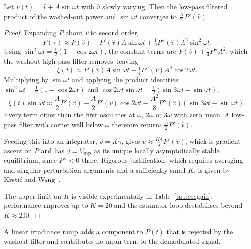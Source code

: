 \begin{proposition}
\label{prop:esc}
Let $v(t) = \hat v + A\sin\omega t$ with $\hat v$ slowly varying. Then the
low-pass filtered product of the washed-out power and $\sin\omega t$ converges
to $\tfrac{A}{2}\,P'(\hat v)$.
\end{proposition}

\begin{proof}
Expanding $P$ about $\hat v$ to second order,
\[
P(v) \approx P(\hat v) + P'(\hat v)A\sin\omega t + \tfrac{1}{2}P''(\hat v)A^2\sin^2\!\omega t .
\]
Using $\sin^2\omega t = \tfrac{1}{2}(1 - \cos 2\omega t)$, the constant terms are
$P(\hat v) + \tfrac{1}{4}P''A^2$, which the washout high-pass filter removes,
leaving
\[
\xi(t) \approx P'(\hat v)A\sin\omega t - \tfrac{1}{4}P''(\hat v)A^2\cos 2\omega t .
\]
Multiplying by $\sin\omega t$ and applying the product identities
$\sin^2\omega t = \tfrac{1}{2}(1-\cos2\omega t)$ and
$\cos 2\omega t \sin\omega t = \tfrac{1}{2}(\sin 3\omega t - \sin\omega t)$,
\[
\xi(t)\sin\omega t \approx \frac{A}{2}P'(\hat v)
- \frac{A}{2}P'(\hat v)\cos 2\omega t
- \frac{A^2}{8}P''(\hat v)\left(\sin 3\omega t - \sin\omega t\right).
\]
Every term other than the first oscillates at $\omega$, $2\omega$ or $3\omega$
with zero mean. A low-pass filter with corner well below $\omega$ therefore
returns $\tfrac{A}{2}P'(\hat v)$.

Feeding this into an integrator, $\dot{\hat v} = K\hat\gamma$, gives
$\dot{\hat v} \approx \tfrac{KA}{2}P'(\hat v)$, which is gradient ascent on $P$
and has $\hat v = V_{\mathrm{mp}}$ as its unique locally asymptotically stable equilibrium,
since $P'' < 0$ there. Rigorous justification, which requires averaging and
singular perturbation arguments and a sufficiently small $K$, is given by
Krsti\'{c} and Wang~\cite{krstic}.

The upper limit on $K$ is visible experimentally in Table~\ref{tab:escgain}:
performance improves up to $K = 20$ and the estimator loop destabilises beyond
$K \approx 200$.
\end{proof}

\begin{proposition}
\label{prop:escramp}
A linear irradiance ramp adds a component to $P(t)$ that is rejected by the
washout filter and contributes no mean term to the demodulated signal.
\end{proposition}

